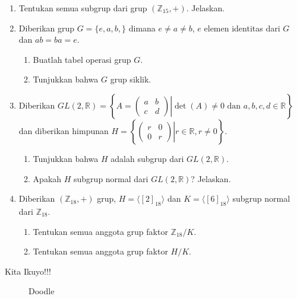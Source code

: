 \documentclass[10pt,openany,a4paper]{article}
\newcommand{\R}{\mathbb{R}}
\newcommand{\Z}{\mathbb{Z}}
\begin{document}
\begin{enumerate}
    \item Tentukan semua subgrup dari grup $(\Z_{15}, +)$. Jelaskan.
    \item Diberikan grup $G = \{e, a, b, \}$ dimana $e\ne a\ne b$, $e$ elemen identitas dari $G$ dan $ab=ba=e$.
    \begin{enumerate}
        \item Buatlah tabel operasi grup $G$.
        \item Tunjukkan bahwa $G$ grup siklik.
    \end{enumerate}
    \item Diberikan $GL(2,\R)=\left\{A=\left.\begin{pmatrix} a & b \\ c & d \end{pmatrix} \right| \det(A)\ne 0 \text{ dan } a,b,c,d\in\R\right\}$ dan diberikan himpunan $H=\left\{\left.\begin{pmatrix} r & 0 \\ 0 & r \end{pmatrix} \right| r\in\R, r\ne 0\right\}$.
    \begin{enumerate}
        \item Tunjukkan bahwa $H$ adalah subgrup dari $GL(2,\R)$.
        \item Apakah $H$ subgrup normal dari $GL(2,\R)$? Jelaskan.
    \end{enumerate}
    \item Diberikan $(\Z_{18},+)$ grup, $H=\langle [2]_{18}\rangle$ dan $K=\langle [6]_{18}\rangle$ subgrup normal dari $\Z_{18}$.
    \begin{enumerate}
        \item Tentukan semua anggota grup faktor $\Z_{18}/K$.
        \item Tentukan semua anggota grup faktor $H/K$.
    \end{enumerate}
\end{enumerate}

\newpage
Kita Ikuyo!!!
\begin{figure}[ht]
    \centering
    \caption{Doodle}
\end{figure}
\end{document}
